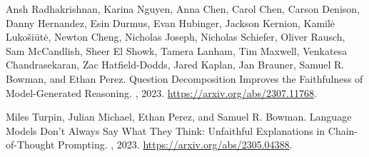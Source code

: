 \documentclass{article}
\begin{document}
\begin{thebibliography}{12}
Ansh Radhakrishnan, Karina Nguyen, Anna Chen, Carol Chen, Carson Denison, Danny Hernandez, Esin Durmus, Evan Hubinger, Jackson Kernion, Kamilė Lukošiūtė, Newton Cheng, Nicholas Joseph, Nicholas Schiefer, Oliver Rausch, Sam McCandlish, Sheer El Showk, Tamera Lanham, Tim Maxwell, Venkatesa Chandrasekaran, Zac Hatfield-Dodds, Jared Kaplan, Jan Brauner, Samuel R. Bowman, and Ethan Perez.
\newblock Question Decomposition Improves the Faithfulness of Model-Generated Reasoning.
, 2023.
\newblock \url{https://arxiv.org/abs/2307.11768}.

Miles Turpin, Julian Michael, Ethan Perez, and Samuel R. Bowman.
\newblock Language Models Don't Always Say What They Think: Unfaithful Explanations in Chain-of-Thought Prompting.
, 2023.
\newblock \url{https://arxiv.org/abs/2305.04388}.

\end{thebibliography}
\end{document}
